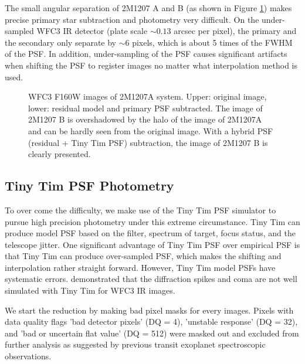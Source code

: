 \documentclass[apj]{emulateapj}
\begin{document}
The small angular separation of 2M1207 A and B (as shown in Figure
\ref{fig:1}) makes precise primary star subtraction and photometry
very difficult. On the under-sampled WFC3 IR detector (plate scale
$\sim 0.13$ arcsec per pixel), the primary and the secondary only
separate by $\sim 6$ pixels, which is about 5 times of the FWHM of the
PSF. In addition, under-sampling of the PSF causes significant
artifacts when shifting the PSF to register images no matter what
interpolation method is used.

\begin{figure}[h]
  \centering
  \caption{WFC3 F160W images of 2M1207A system. Upper: original image,
    lower: residual model and primary PSF subtracted. The image of
    2M1207 B is overshadowed by the halo of the image of 2M1207A and
    can be hardly seen from the original image. With a hybrid PSF
    (residual + Tiny Tim PSF) subtraction, the image of 2M1207 B is
    clearly presented.}
  \label{fig:1}
\end{figure}
\subsection{Tiny Tim PSF Photometry}
To over come the difficulty, we make use of the Tiny Tim PSF simulator
to pursue high precision photometry under this extreme
circumstance. Tiny Tim can produce model PSF based on the filter,
spectrum of target, focus status, and the telescope jitter. One
significant advantage of Tiny Tim PSF over empirical PSF is that Tiny Tim can
produce over-sampled PSF, which makes the shifting and interpolation
rather straight forward. However, Tiny Tim model PSFs have systematic
errors. \citeauthor{Biretta2014} demonstrated that the diffraction
spikes and coma are not well simulated with Tiny Tim for WFC3 IR images.

We start the reduction by making bad pixel masks for every
images. Pixels with data quality flags 'bad detector pixels' (DQ = 4),
'unstable response' (DQ = 32), and 'bad or uncertain flat value' (DQ =
512) were masked out and excluded from further analysis as suggested
by previous transit exoplanet
spectroscopic observations\citep[e.g.][]{Berta2012, Kreidberg2014}.
\end{document}
